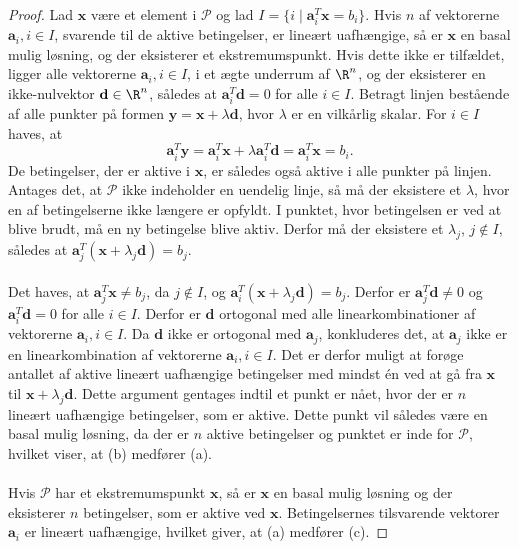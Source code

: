 \begin{proof}
Lad $\textbf{x}$ være et element i $\mathcal{P}$ og lad $I = \{ i \mid \textbf{a}_i^T\textbf{x} = b_i \}$.
Hvis $n$ af vektorerne  $\textbf{a}_i, i \in I$, svarende til de aktive betingelser, er lineært uafhængige, så er $\textbf{x}$ en basal mulig løsning, og der eksisterer et ekstremumspunkt.
Hvis dette ikke er tilfældet, ligger alle vektorerne $\textbf{a}_i, i \in I$, i et ægte underrum af $\R^n$, og der eksisterer en ikke-nulvektor $\textbf{d} \in \R^n$, således at $\textbf{a}_i^T\textbf{d} = 0$ for alle $i \in I$.
Betragt linjen bestående af alle punkter på formen $\textbf{y} = \textbf{x} + \lambda \textbf{d}$, hvor $\lambda$ er en vilkårlig skalar.
For $i \in I$ haves, at $$\textbf{a}_i^T\textbf{y} = \textbf{a}_i^T\textbf{x} + \lambda \textbf{a}_i^T\textbf{d} = \textbf{a}_i^T\textbf{x} = b_i.$$
De betingelser, der er aktive i $\textbf{x}$, er således også aktive i alle punkter på linjen.
Antages det, at $\mathcal{P}$ ikke indeholder en uendelig linje, så må der eksistere et $\lambda$, hvor en af betingelserne ikke længere er opfyldt.
I punktet, hvor betingelsen er ved at blive brudt, må en ny betingelse blive aktiv.
Derfor må der eksistere et $\lambda_j$, $j \notin I$, således at $\textbf{a}_j^T (\textbf{x} + \lambda_j\textbf{d}) = b_j$.\\\\
%
Det haves, at $\textbf{a}_j^T\textbf{x} \neq b_j$, da $j \notin I$, og $\textbf{a}_i^T (\textbf{x} + \lambda_j\textbf{d}) = b_j$.
Derfor er $\textbf{a}_j^T\textbf{d} \neq 0$ og $\textbf{a}_i^T\textbf{d} = 0$ for alle $i \in I$.
Derfor er $\textbf{d}$ ortogonal med alle linearkombinationer af vektorerne $\textbf{a}_i, i\in I$.
Da $\textbf{d}$ ikke er ortogonal med $\textbf{a}_j$, konkluderes det, at $\textbf{a}_j$ ikke er en linearkombination af vektorerne $\textbf{a}_i, i \in I$.
Det er derfor muligt at forøge antallet af aktive lineært uafhængige betingelser med mindst én ved at gå fra $\textbf{x}$ til $\textbf{x} + \lambda_j\textbf{d}$.
Dette argument gentages indtil et punkt er nået, hvor der er $n$ lineært uafhængige betingelser, som er aktive.
Dette punkt vil således være en basal mulig løsning, da der er $n$ aktive betingelser og punktet er inde for $\mathcal{P}$, hvilket viser, at (b) medfører (a).\\\\
%
Hvis $\mathcal{P}$ har et ekstremumspunkt $\textbf{x}$, så er $\textbf{x}$ en basal mulig løsning og der eksisterer $n$ betingelser, som er aktive ved $\textbf{x}$.
Betingelsernes tilsvarende vektorer $\textbf{a}_i$ er lineært uafhængige, hvilket giver, at (a) medfører (c).

\end{proof}
